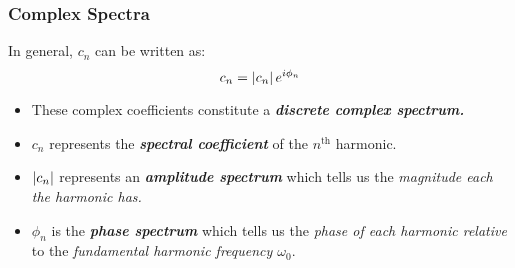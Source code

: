 \subsubsection{Complex Spectra}
In general, $c_n$ can be written as:
\begin{equation}
    c_n=\left|c_n\right|e^{i\phi_n}
\end{equation}
\begin{itemize}
    \item These complex coefficients constitute a \textbf{\textit{discrete complex spectrum.}}
    \item $c_n$ represents the \textit{\textbf{spectral coefficient}} of the $n^\text{th}$ harmonic.
    \item $\left|c_n\right|$ represents an \textbf{\textit{amplitude spectrum}} which tells us the \textit{magnitude each the harmonic has.}
    \item $\phi_n$ is the \textit{\textbf{phase spectrum}} which tells us the \textit{phase of each harmonic relative} to the \textit{fundamental harmonic frequency $\omega_0$}.
\end{itemize}
